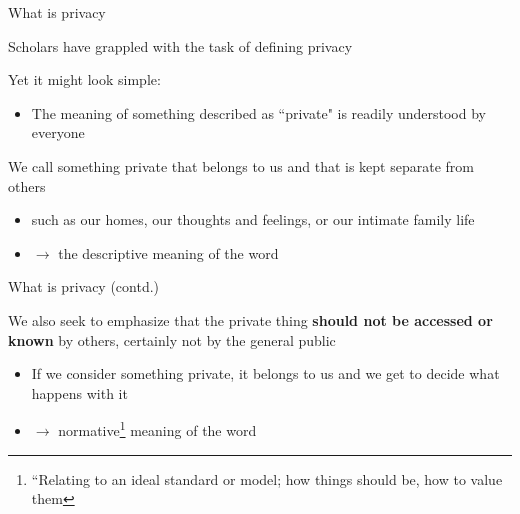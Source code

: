 \documentclass[12pt,aspectratio=169,handout]{beamer}
\begin{document}
\begin{frame}{What is privacy}

Scholars have grappled with the task of defining privacy

Yet it might look simple:

\begin{itemize}
\item The meaning of something described as ``private" is readily understood by everyone
\end{itemize}

We call something private that belongs to us and that is kept separate from others

\begin{itemize}
\item such as our homes, our thoughts and feelings, or our intimate family life
\item $\rightarrow$ the descriptive meaning of the word
\end{itemize}



\end{frame}

\begin{frame}{What is privacy (contd.)}

We also seek to emphasize that the private thing \textbf{should not be accessed or known} by others, certainly not by the general public

\begin{itemize}
\item If we consider something private, it belongs to us and we get to decide what happens with it
\item $\rightarrow$ normative\footnote{``Relating to an ideal standard or model; how things should be, how to value them} meaning of the word
\end{itemize}



\end{frame}
\end{document}

